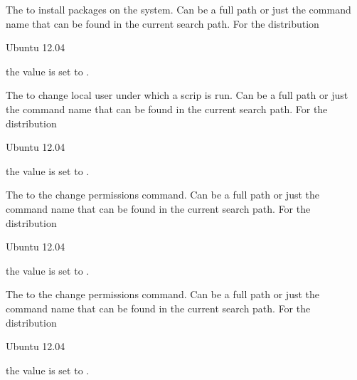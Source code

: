 
The  to install packages on the system. Can be a full path or
just the command name that can be found in the current search path. 
For the distribution
\begin{inparaitem}
\item[\TheDistribution{ubuntu}] Ubuntu 12.04
\end{inparaitem}
the value is set to .


The  to change local user under which a scrip is run. Can be a full path or
just the command name that can be found in the current search path. 
For the distribution
\begin{inparaitem}
\item[\TheDistribution{ubuntu}] Ubuntu 12.04
\end{inparaitem}
the value is set to .


The  to the change permissions command. Can be a full path or
just the command name that can be found in the current search path. 
For the distribution
\begin{inparaitem}
\item[\TheDistribution{ubuntu}] Ubuntu 12.04
\end{inparaitem}
the value is set to .


The  to the change permissions command. Can be a full path or
just the command name that can be found in the current search path. 
For the distribution
\begin{inparaitem}
\item[\TheDistribution{ubuntu}] Ubuntu 12.04
\end{inparaitem}
the value is set to .

